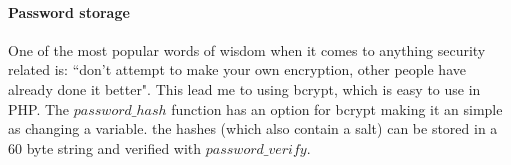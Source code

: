 \documentclass[12pt,a4paper]{report}
\begin{document}
	\paragraph{Password storage}
	One of the most popular words of wisdom when it comes to anything security related is: ``don't attempt to make your own encryption, other people have already done it better". This lead me to using bcrypt, which is easy to use in PHP. The $password\_hash$ function has an option for bcrypt making it an simple as changing a variable. the hashes (which also contain a salt) can be stored in a 60 byte string and verified with $password\_verify$.
\end{document}
